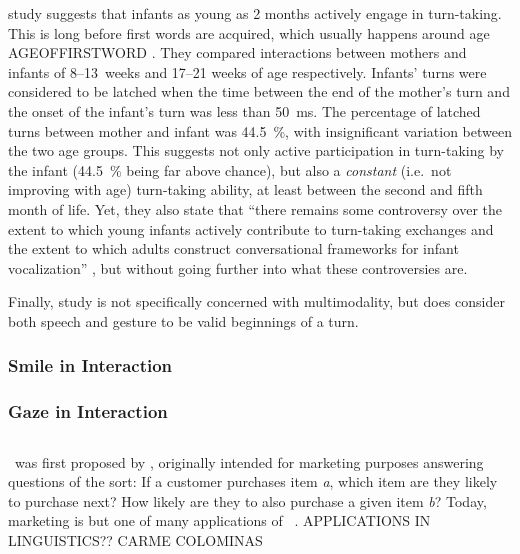  study suggests that infants as young as 2 months actively engage in turn-taking.
This is long before first words are acquired, which usually happens around age AGEOFFIRSTWORD \citep{nosource}.
 They compared interactions between mothers and infants of 8--13~weeks and 17--21 weeks of age respectively.
Infants' turns were considered to be latched when the time between the end of the mother's turn and the onset of the infant's turn was less than 50~ms.
The percentage of latched turns between mother and infant was 44.5~\%, with insignificant variation between the two age groups.
This suggests not only active participation in turn-taking by the infant (44.5~\% being far above chance), but also a \emph{constant} (i.e.\ not improving with age) turn-taking ability, at least between the second and fifth month of life.
Yet, they also state that ``there remains some controversy over the extent to which young infants actively contribute to turn-taking exchanges and the extent to which adults construct conversational frameworks for infant vocalization'' \citep[]{gratier_early_2015}, but without going further into what these controversies are.

Finally,  study is not specifically concerned with multimodality, but does consider both speech and gesture to be valid beginnings of a turn.

\subsubsection{Smile in Interaction}
\subsubsection{Gaze in Interaction}


\subsection{\fpmupper}
\fpmsentence\ was first proposed by \citet{agrawal_mining_1993}, originally intended for marketing purposes answering questions of the sort: If a customer purchases item \emph{a}, which item are they likely to purchase next? How likely are they to also purchase a given item \emph{b}? Today, marketing is but one of many applications of \fpmlower\ \citep[]{han_frequent_2007}.
APPLICATIONS IN LINGUISTICS?? CARME COLOMINAS




